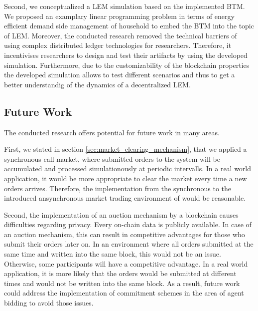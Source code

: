 Second, we conceptualized a LEM simulation based on the implemented
BTM. We proposed an examplary linear programming problem in terms of energy efficient 
demand side management of household to embed the BTM into the topic of LEM.
Moreover, the conducted research removed the technical barriers of using complex 
distributed ledger technologies for researchers.
Therefore, it incentivises researchers 
to design and test their artifacts by using the developed simulation.
Furthermore, due to the customizability of the blockchain properties 
the developed simulation allows to test different scenarios and thus to get a
better understandig of the dynamics of a decentralized LEM.

\subsection{Future Work}
The conducted research offers potential for future work in many areas.

First, we stated in section \ref{sec:market_clearing_mechanism}, that we
applied a synchronous call market, where submitted orders to the system
will be accumulated and processed simulationously at periodic intervalls.
In a real world application, it would be more appropriate to clear 
the market every time a new orders arrives. Therefore,
the implementation from the synchronous to the introduced ansynchronous market trading 
environment of  would be reasonable. 

Second, the implementation of an 
auction mechanism by a blockchain causes 
difficulties regarding privacy. Every on-chain data 
is publicly available. 
In case of an auction mechanism, this can result in competitive advantages
for those who submit their orders later on. 
In an environment where all orders submitted at the same time and written 
into the same block, this would not be an issue. 
Otherwise, some participants will have a competitive advantage.
In a real world application, it is more likely that the orders would be submitted at different
times and would not be written into the same block. 
As a result, future work could address the implementation of commitment schemes
in the area of agent bidding to avoid those issues.

